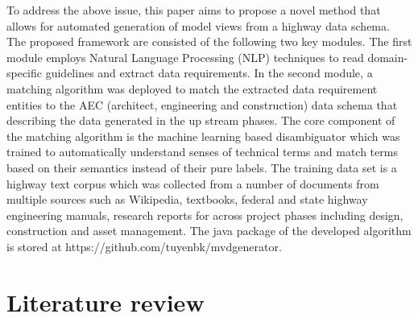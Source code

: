 \documentclass[Journal, InsideFigs, DoubleSpace]{ascelike} %
\begin{document}

%
To address the above issue, this paper aims to propose a novel method that allows for automated generation of model views from a highway data schema. The proposed framework are consisted of the following two key modules. The first module employs Natural Language Processing (NLP) techniques to read domain-specific guidelines and extract data requirements. In the second module, a matching algorithm was deployed to match the extracted data requirement entities to the AEC (architect, engineering and construction) data schema that describing the data generated in the up stream phases. The core component of the matching algorithm is the machine learning based disambiguator which was trained to automatically understand senses of technical terms and match terms based on their semantics instead of their pure labels. The training data set is a highway text corpus which was collected from a number of documents from multiple sources such as Wikipedia, textbooks, federal and state highway engineering manuals, research reports for across project phases including design, construction and asset management. The java package of the developed algorithm is stored at https://github.com/tuyenbk/mvdgenerator.
%
\section{Literature review} \label{sec:litrev} %
\end{document}
